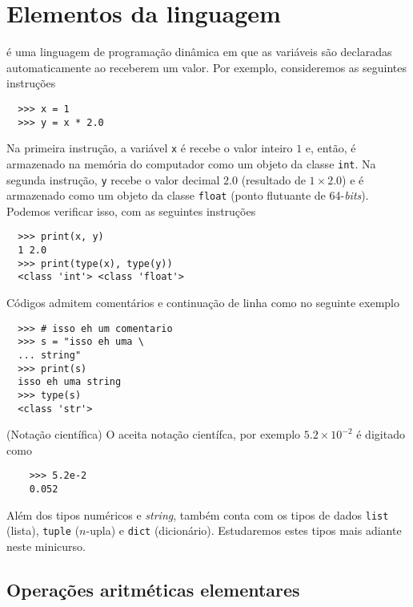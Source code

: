 \documentclass[12pt]{article}
\begin{document}
\section{Elementos da linguagem}\label{sec_elem}

{\python} é uma linguagem de programação dinâmica em que as variáveis são declaradas automaticamente ao receberem um valor. Por exemplo, consideremos as seguintes instruções
\begin{lstlisting}
  >>> x = 1
  >>> y = x * 2.0
\end{lstlisting}
Na primeira instrução, a variável \lstinline+x+ é recebe o valor inteiro $1$ e, então, é armazenado na memória do computador como um objeto da classe \lstinline+int+. Na segunda instrução, \lstinline+y+ recebe o valor decimal $2.0$ (resultado de $1\times 2.0$) e é armazenado como um objeto da classe \lstinline+float+ (ponto flutuante de 64-{\it bits}). Podemos verificar isso, com as seguintes instruções
\begin{lstlisting}
  >>> print(x, y)
  1 2.0
  >>> print(type(x), type(y))
  <class 'int'> <class 'float'>
\end{lstlisting}

Códigos {\python} admitem comentários e continuação de linha como no seguinte exemplo
\begin{lstlisting}
  >>> # isso eh um comentario
  >>> s = "isso eh uma \
  ... string"
  >>> print(s)
  isso eh uma string
  >>> type(s)
  <class 'str'>
\end{lstlisting}

\begin{obs}(Notação científica)
  O {\python} aceita notação científca, por exemplo $5.2\times 10^{-2}$ é digitado como
  \begin{lstlisting}
    >>> 5.2e-2
    0.052
  \end{lstlisting}
\end{obs}

\begin{obs}
  Além dos tipos numéricos e {\it string}, {\python} também conta com os tipos de dados \lstinline+list+ (lista), \lstinline+tuple+ ($n$-upla) e \lstinline+dict+ (dicionário). Estudaremos estes tipos mais adiante neste minicurso.
\end{obs}

\subsection{Operações aritméticas elementares}
\end{document}
